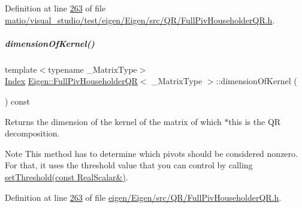 Definition at line \hyperlink{matio_2visual__studio_2test_2eigen_2_eigen_2src_2_q_r_2_full_piv_householder_q_r_8h_source_l00263}{263} of file \hyperlink{matio_2visual__studio_2test_2eigen_2_eigen_2src_2_q_r_2_full_piv_householder_q_r_8h_source}{matio/visual\+\_\+studio/test/eigen/\+Eigen/src/\+Q\+R/\+Full\+Piv\+Householder\+Q\+R.\+h}.

\mbox{\label{group___q_r___module_a3b5fe5edc66acc01c45b16e728470aa0}} 
\subparagraph{\texorpdfstring{dimension\+Of\+Kernel()}{dimensionOfKernel()}\hspace{0.1cm}{\footnotesize\ttfamily [2/2]}}
{\footnotesize\ttfamily template$<$typename \+\_\+\+Matrix\+Type$>$ \\
\hyperlink{namespace_eigen_a62e77e0933482dafde8fe197d9a2cfde}{Index} \hyperlink{group___q_r___module_class_eigen_1_1_full_piv_householder_q_r}{Eigen\+::\+Full\+Piv\+Householder\+QR}$<$ \+\_\+\+Matrix\+Type $>$\+::dimension\+Of\+Kernel (\begin{DoxyParamCaption}{ }\end{DoxyParamCaption}) const\hspace{0.3cm}{\ttfamily [inline]}}

\begin{DoxyReturn}{Returns}
the dimension of the kernel of the matrix of which $\ast$this is the QR decomposition.
\end{DoxyReturn}
\begin{DoxyNote}{Note}
This method has to determine which pivots should be considered nonzero. For that, it uses the threshold value that you can control by calling \hyperlink{group___q_r___module_a92277e572bf98245891015d12dd2b602}{set\+Threshold(const Real\+Scalar\&)}. 
\end{DoxyNote}


Definition at line \hyperlink{eigen_2_eigen_2src_2_q_r_2_full_piv_householder_q_r_8h_source_l00263}{263} of file \hyperlink{eigen_2_eigen_2src_2_q_r_2_full_piv_householder_q_r_8h_source}{eigen/\+Eigen/src/\+Q\+R/\+Full\+Piv\+Householder\+Q\+R.\+h}.

